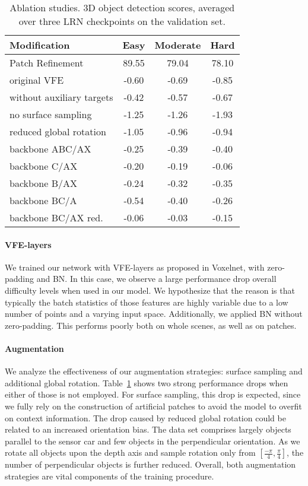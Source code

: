 \documentclass{article}
\begin{document}
\begin{table}[ht]
\begin{center}
\begin{tabular}{l|c|c|c}
\hline
Modification & Easy & Moderate & Hard \\
\hline\hline
Patch Refinement & 89.55 & 79.04 & 78.10  \\
\hline\hline
original VFE & -0.60 & -0.69 & -0.85 \\
without auxiliary targets & -0.42 & -0.57 & -0.67 \\	
\hline
no surface sampling & -1.25 & -1.26 & -1.93 \\
reduced global rotation & -1.05 & -0.96 & -0.94 \\
\hline
backbone ABC/AX & -0.25 & -0.39 & -0.40\\
backbone C/AX & -0.20 & -0.19 & -0.06\\
backbone B/AX  & -0.24 & -0.32 & -0.35 \\
backbone BC/A & -0.54 & -0.40 & -0.26\\
backbone BC/AX red. & -0.06 & -0.03 & -0.15 \\
\hline
\end{tabular}
\end{center}
\caption{Ablation studies. 3D object detection scores, averaged over three LRN checkpoints on the validation set.}
\label{tab:ablations}
\end{table}

\paragraph{VFE-layers}
We trained our network with VFE-layers as proposed in Voxelnet, with zero-padding and BN. In this case, we observe a large performance drop overall difficulty levels when used in our model. We hypothesize that the reason is that typically
the batch statistics of those features are highly variable due to a low number of points and a varying input space. 
Additionally, we applied BN without zero-padding. This performs poorly both on whole scenes, as well as on patches.

\paragraph{Augmentation}
We analyze the effectiveness of our augmentation strategies: 
surface sampling and additional global rotation. 
Table~\ref{tab:ablations} shows two strong performance drops when
either of those is not employed. 
For surface sampling, this drop is expected, since we fully rely on the construction of artificial patches to avoid the model to overfit on context information.
The drop caused by reduced global rotation could be related to
an increased orientation bias. The data set comprises largely objects parallel to the sensor car and few objects in the perpendicular
orientation. As we rotate all objects
upon the depth axis and sample rotation only from $[\frac{-\pi}{4},\frac{\pi}{4}]$,
the number of perpendicular objects is further reduced. 
Overall, both augmentation strategies are vital components of the
training procedure. 
\end{document}
